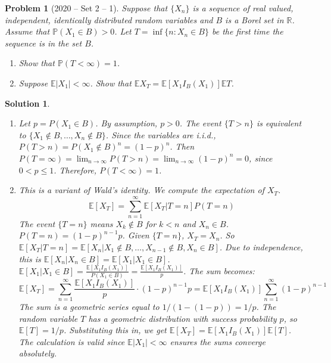 \documentclass[12pt]{amsart}
\newtheorem{problem}{Problem}
\newtheorem*{solution}{Solution}
\begin{document}
\begin{problem}[2020 -- Set 2 -- 1]
Suppose that $\{X_n\}$ is a sequence of real valued, independent, identically distributed random variables and $B$ is a Borel set in $\mathbb{R}$. Assume that $\mathbb{P}(X_1 \in B)>0$. Let $T=\inf \{n: X_n \in B\}$ be the first time the sequence is in the set $B$.
\begin{enumerate}[label=(\alph*)]
\item Show that $\mathbb{P}(T<\infty)=1$.
\item Suppose $\mathbb{E}|X_1|<\infty$. Show that $\mathbb{E} X_T=\mathbb{E}[X_1 I_B(X_1)] \mathbb{E} T$.
\end{enumerate}
\end{problem}
\begin{solution}
\begin{enumerate}[label=(\alph*)]
\item Let $p = P(X_1 \in B)$. By assumption, $p>0$. The event $\{T>n\}$ is equivalent to $\{X_1 \notin B, \ldots, X_n \notin B\}$. Since the variables are i.i.d., $P(T>n) = P(X_1 \notin B)^n = (1-p)^n$.
Then $P(T=\infty) = \lim_{n\to\infty} P(T>n) = \lim_{n\to\infty} (1-p)^n = 0$, since $0 < p \le 1$.
Therefore, $P(T<\infty)=1$.
\item This is a variant of Wald's identity. We compute the expectation of $X_T$.
$$ \mathbb{E}[X_T] = \sum_{n=1}^\infty \mathbb{E}[X_T | T=n]P(T=n) $$
The event $\{T=n\}$ means $X_k \notin B$ for $k<n$ and $X_n \in B$.
$P(T=n) = (1-p)^{n-1}p$.
Given $\{T=n\}$, $X_T = X_n$. So $\mathbb{E}[X_T | T=n] = \mathbb{E}[X_n | X_1 \notin B, \dots, X_{n-1} \notin B, X_n \in B]$.
Due to independence, this is $\mathbb{E}[X_n | X_n \in B] = \mathbb{E}[X_1 | X_1 \in B]$.
$\mathbb{E}[X_1 | X_1 \in B] = \frac{\mathbb{E}[X_1 I_B(X_1)]}{P(X_1 \in B)} = \frac{\mathbb{E}[X_1 I_B(X_1)]}{p}$.
The sum becomes:
$$ \mathbb{E}[X_T] = \sum_{n=1}^\infty \frac{\mathbb{E}[X_1 I_B(X_1)]}{p} \cdot (1-p)^{n-1}p = \mathbb{E}[X_1 I_B(X_1)] \sum_{n=1}^\infty (1-p)^{n-1} $$
The sum is a geometric series equal to $1/(1-(1-p)) = 1/p$.
The random variable $T$ has a geometric distribution with success probability $p$, so $\mathbb{E}[T]=1/p$.
Substituting this in, we get $\mathbb{E}[X_T] = \mathbb{E}[X_1 I_B(X_1)] \mathbb{E}[T]$. The calculation is valid since $\mathbb{E}|X_1|<\infty$ ensures the sums converge absolutely.
\end{enumerate}
\end{solution}
\end{document}
